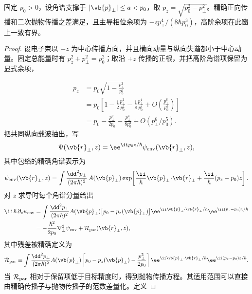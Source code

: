 \begin{proposition}[正根角谱与抛物传播误差]
固定 $p_0>0$，设角谱支撑于 $|\vb{p}_\perp|\le a<p_0$，取 $p_z=\sqrt{p_0^2-p_\perp^2}$。精确正向传播和二次抛物传播之差满足，且主导相位余项为 $-zp_\perp^4/(8\hbar p_0^3)$，高阶余项在此窗上一致有界。
\end{proposition}
\begin{proof}
设电子束以 $+z$ 为中心传播方向，并且横向动量与纵向失谐都小于中心动量。固定总能量时有 $p_z^2+p_\perp^2=p_0^2$；取沿 $+z$ 传播的正根，并把高阶角谱项保留为显式余项，

\begin{align*}
p_z
&=p_0\sqrt{1-\frac{p_\perp^2}{p_0^2}}\\
&=p_0\left[1-\frac12\frac{p_\perp^2}{p_0^2}
-\frac18\frac{p_\perp^4}{p_0^4}
+O\!\left(\frac{p_\perp^6}{p_0^6}\right)\right]\\
&=p_0-\frac{p_\perp^2}{2p_0}
-\frac{p_\perp^4}{8p_0^3}+O(p_\perp^6/p_0^5).
\end{align*}
把共同纵向载波抽出，写
\begin{equation*}
\Psi(\vb{r}_\perp,z)
=\ee^{\ii p_0z/\hbar}\psi_{\rm env}(\vb{r}_\perp,z),
\end{equation*}
其中包络的精确角谱表示为
\begin{equation*}
\psi_{\rm env}(\vb{r}_\perp,z)
=\int\frac{\dd^2 p_\perp}{(2\pi\hbar)^2}
\,A(\vb{p}_\perp)
\exp\!\left[\frac{\ii}{\hbar}
\vb{p}_\perp\!\cdot\!\vb{r}_\perp
+\frac{\ii}{\hbar}(p_z-p_0)z\right].
\end{equation*}
对 $z$ 求导时每个角谱分量给出
\begin{align*}
\ii\hbar\,\partial_z\psi_{\rm env}
&=\int\frac{\dd^2 p_\perp}{(2\pi\hbar)^2}
A(\vb{p}_\perp)
\bigl[p_0-p_z(\vb{p}_\perp)\bigr]
\ee^{\ii\vb{p}_\perp\cdot\vb{r}_\perp/\hbar}
\ee^{\ii(p_z-p_0)z/\hbar}\\
&=-\frac{\hbar^2}{2p_0}\nabla_\perp^2\psi_{\rm env}
+\mathcal R_{\rm par}(\vb{r}_\perp,z),
\end{align*}
其中残差被精确定义为
\begin{equation*}
\mathcal R_{\rm par}
\equiv
\int\frac{\dd^2 p_\perp}{(2\pi\hbar)^2}
A(\vb{p}_\perp)
\left[p_0-p_z(\vb{p}_\perp)-\frac{p_\perp^2}{2p_0}\right]
\ee^{\ii\vb{p}_\perp\cdot\vb{r}_\perp/\hbar}
\ee^{\ii(p_z-p_0)z/\hbar}.
\end{equation*}
当 $\mathcal R_{\rm par}$ 相对于保留项低于目标精度时，得到抛物传播方程。其适用范围可以直接由精确传播子与抛物传播子的范数差量化。定义

\end{proof}
